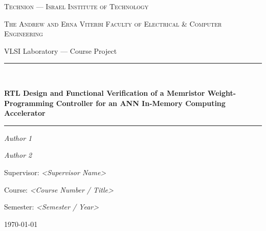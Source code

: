 
\begin{titlepage}
\centering
\vspace*{1.5cm}

{\scshape\Large Technion --- Israel Institute of Technology \par}
\vspace{0.4cm}
{\scshape\large The Andrew and Erna Viterbi Faculty of Electrical \& Computer Engineering \par}
\vspace{0.3cm}
{\large VLSI Laboratory --- Course Project \par}

\vspace{2.5cm}

\rule{\linewidth}{0.5pt}\\[0.4cm]
{\huge\bfseries RTL Design and Functional Verification of a Memristor
Weight-Programming Controller for an ANN In-Memory Computing Accelerator \par}
\vspace{0.4cm}
\rule{\linewidth}{0.5pt}

\vspace{2cm}

{\Large\itshape Author 1 \par}
\vspace{0.3cm}
{\Large\itshape Author 2 \par}

\vfill

{\large Supervisor: \textit{<Supervisor Name>}\par}
\vspace{0.3cm}
{\large Course: \textit{<Course Number / Title>}\par}
\vspace{0.3cm}
{\large Semester: \textit{<Semester / Year>}\par}

\vspace{1.5cm}

{\large \today\par}
\end{titlepage}

\clearpage
